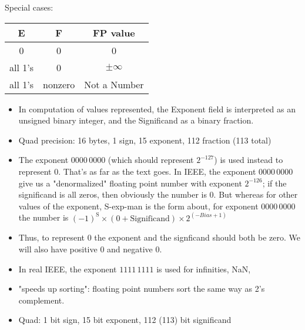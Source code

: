 \begin{frame}[fragile]

Special cases:
\begin{multicols}{2}
  {\footnotesize  
\begin{tabular}{ |c|c || c |}
    \hline 
    E & F  & FP value \\ \hline\hline
    0 & 0  & 0 \\ \hline
    all 1's & 0 & $\pm \infty$ \\ \hline
    all 1's & nonzero & Not a Number \\ \hline
\end{tabular}
}

\columnbreak

\end{multicols}
% 
\BNotes\ifnum{}
\begin{itemize}
\item In computation of values represented, the Exponent field is interpreted 
	as an unsigned binary integer, and the Significand as a binary fraction.
\item Quad precision: 16 bytes, 1 sign, 15 exponent, 112 fraction (113 total)
\item The exponent $0000\,0000$ (which should represent $2^{-127}$)
	is used instead to represent 0.  That's as far as the text goes.
	  In IEEE, the
	exponent $0000\,0000$ give us a "denormalized" floating point
	number with exponent $2^{-126}$; if the significand is all zeros,
	then obviously the number is 0.  But whereas for other values
	of the exponent,
	S-exp-man is the form about, for exponent $0000\,0000$ the
	number is $(-1)^{\mbox{S}} \times (0 + \mbox{Significand}) \times 2^{(-Bias+1)}$
\item Thus, to represent 0 the exponent and the signficand should both be
	zero.  We will also have positive 0 and negative 0.
\item In real IEEE, the exponent $1111\,1111$ is used for infinities, NaN,
\item "speeds up sorting": floating point numbers sort the same way as 2's complement.
\item Quad: 1 bit sign, 15 bit exponent, 112 (113) bit significand
\end{itemize}
\fi\ENotes
\end{frame}



